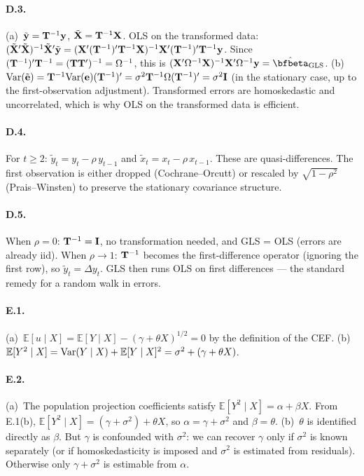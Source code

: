 \documentclass{article}
\newcommand{\E}{\mathbb{E}}
\begin{document}
\paragraph{D.3.}  (a)~$\tilde{{\mathbf y}} = {\mathbf T}^{-1}{\mathbf y}$, $\tilde{{\mathbf X}} = {\mathbf T}^{-1}{\mathbf X}$.  OLS on the transformed data: $(\tilde{{\mathbf X}}'\tilde{{\mathbf X}})^{-1}\tilde{{\mathbf X}}'\tilde{{\mathbf y}} = ({\mathbf X}'({\mathbf T}^{-1})'{\mathbf T}^{-1}{\mathbf X})^{-1}{\mathbf X}'({\mathbf T}^{-1})'{\mathbf T}^{-1}{\mathbf y}$.  Since $({\mathbf T}^{-1})'{\mathbf T}^{-1} = ({\mathbf T}{\mathbf T}')^{-1} = \Omega^{-1}$, this is $(\bfX'\Omega^{-1}\bfX)^{-1}\bfX'\Omega^{-1}\bfy = \hat\bfbeta_{\text{GLS}}$.  (b)~$\mbox{Var}(\tilde{{\mathbf e}}) = {\mathbf T}^{-1}\mbox{Var}({\mathbf e})({\mathbf T}^{-1})' = \sigma^2 {\mathbf T}^{-1}\Omega ({\mathbf T}^{-1})' = \sigma^2{\mathbf I}$ (in the stationary case, up to the first-observation adjustment).  Transformed errors are homoskedastic and uncorrelated, which is why OLS on the transformed data is efficient.

\paragraph{D.4.}  For $t \geq 2$: $\tilde y_t = y_t - \rho\, y_{t-1}$ and $\tilde x_t = x_t - \rho\, x_{t-1}$.  These are quasi-differences.  The first observation is either dropped (Cochrane--Orcutt) or rescaled by $\sqrt{1-\rho^2}$ (Prais--Winsten) to preserve the stationary covariance structure.

\paragraph{D.5.}  When $\rho = 0$: ${\mathbf T}^{-1} = {\mathbf I}$, no transformation needed, and GLS = OLS (errors are already iid).  When $\rho \to 1$: ${\mathbf T}^{-1}$ becomes the first-difference operator (ignoring the first row), so $\tilde y_t = \Delta y_t$.  GLS then runs OLS on first differences --- the standard remedy for a random walk in errors.

\bigskip

\paragraph{E.1.}  (a)~$\E[u \mid X] = \E[Y \mid X] - (\gamma + \theta X)^{1/2} = 0$ by the definition of the CEF.  (b)~$\E[Y^2\mid X] = \Var(Y\mid X) + \E[Y\mid X]^2 = \sigma^2 + (\gamma + \theta X)$.

\paragraph{E.2.}  (a)~The population projection coefficients satisfy $\E[Y^2\mid X] = \alpha + \beta X$.  From E.1(b), $\E[Y^2\mid X] = (\gamma + \sigma^2) + \theta X$, so $\alpha = \gamma + \sigma^2$ and $\beta = \theta$.  (b)~$\theta$ is identified directly as $\beta$.  But $\gamma$ is confounded with $\sigma^2$: we can recover $\gamma$ only if $\sigma^2$ is known separately (or if homoskedasticity is imposed and $\sigma^2$ is estimated from residuals).  Otherwise only $\gamma + \sigma^2$ is estimable from $\alpha$.
\end{document}
